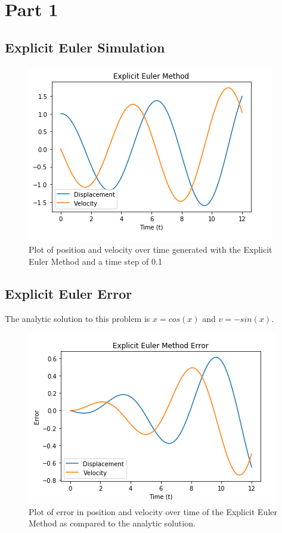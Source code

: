\documentclass{article}
\title{Ph20 Problem Set #3}
\author{Morgaine Mandigo-Stoba}
\date{TA: Christopher White}
\begin{document}
\maketitle

\section{Part 1}

\subsection{Explicit Euler Simulation}

\begin{figure}[h!]
\centering
\includegraphics[scale=0.35]{exp_euler.png}
\caption{Plot of position and velocity over time generated with the Explicit Euler Method and a time step of 0.1}
\label{fig:expeuler}
\end{figure}

\subsection{Explicit Euler Error}

The analytic solution to this problem is $x=cos(x)$ and $v=-sin(x)$. 

\begin{figure}[h!]
\centering
\includegraphics[scale=0.35]{exp_euler_err.png}
\caption{Plot of error in position and velocity over time of the Explicit Euler Method as compared to the analytic solution.}
\label{fig:expeulererr}
\end{figure}
\end{document}

